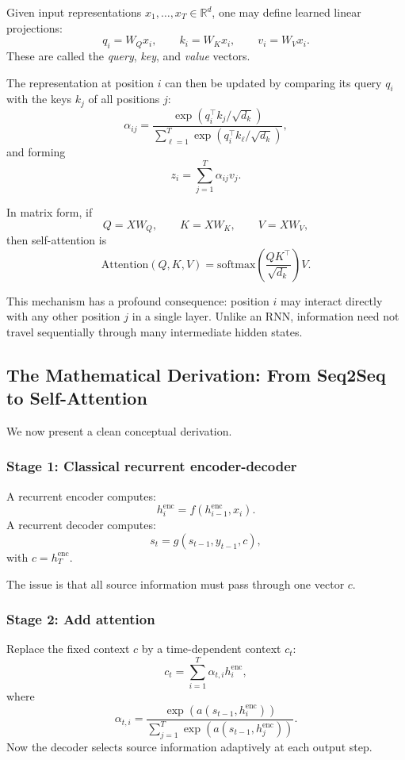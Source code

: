 Given input representations \(x_1,\dots,x_T \in \mathbb{R}^d\), one may define learned linear projections:
\[
q_i = W_Q x_i, \qquad k_i = W_K x_i, \qquad v_i = W_V x_i.
\]
These are called the \emph{query}, \emph{key}, and \emph{value} vectors.

The representation at position \(i\) can then be updated by comparing its query \(q_i\) with the keys \(k_j\) of all positions \(j\):
\[
\alpha_{ij}
=
\frac{\exp(q_i^\top k_j / \sqrt{d_k})}
{\sum_{\ell=1}^T \exp(q_i^\top k_\ell / \sqrt{d_k})},
\]
and forming
\[
z_i = \sum_{j=1}^T \alpha_{ij} v_j.
\]

In matrix form, if
\[
Q = XW_Q, \qquad K = XW_K, \qquad V = XW_V,
\]
then self-attention is
\[
\mathrm{Attention}(Q,K,V)
=
\mathrm{softmax}\!\left(\frac{QK^\top}{\sqrt{d_k}}\right)V.
\]

This mechanism has a profound consequence: position \(i\) may interact directly with any other position \(j\) in a single layer. Unlike an RNN, information need not travel sequentially through many intermediate hidden states.

\subsection{The Mathematical Derivation: From Seq2Seq to Self-Attention}

We now present a clean conceptual derivation.

\subsubsection{Stage 1: Classical recurrent encoder-decoder}

A recurrent encoder computes:
\[
h_i^{\text{enc}} = f(h_{i-1}^{\text{enc}}, x_i).
\]
A recurrent decoder computes:
\[
s_t = g(s_{t-1}, y_{t-1}, c),
\]
with \(c = h_T^{\text{enc}}\).

The issue is that all source information must pass through one vector \(c\).

\subsubsection{Stage 2: Add attention}

Replace the fixed context \(c\) by a time-dependent context \(c_t\):
\[
c_t = \sum_{i=1}^T \alpha_{t,i} h_i^{\text{enc}},
\]
where
\[
\alpha_{t,i}
=
\frac{\exp(a(s_{t-1}, h_i^{\text{enc}}))}
{\sum_{j=1}^T \exp(a(s_{t-1}, h_j^{\text{enc}}))}.
\]
Now the decoder selects source information adaptively at each output step.


